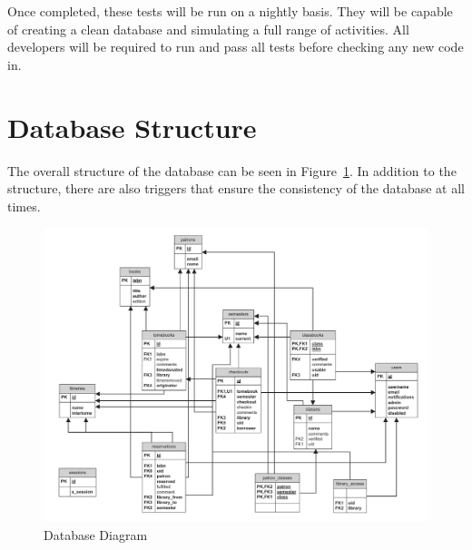 \documentclass[12pt,titlepage]{article}
\begin{document}
Once completed, these tests will be run on a nightly basis.  They will be capable of creating a clean database and simulating a full range of activities.  All developers will be required to run and pass all tests before checking any new code in.
\section{Database Structure}
\label{tomedbsection}
The overall structure of the database can be seen in Figure~\ref{tomedb}.  In addition to the structure, there are also triggers that ensure the consistency of the database at all times.
\begin{figure}[h]
	\includegraphics[width=\textwidth]{tomedb}
	\caption{Database Diagram}
	\label{tomedb}
\end{figure}
\end{document}
